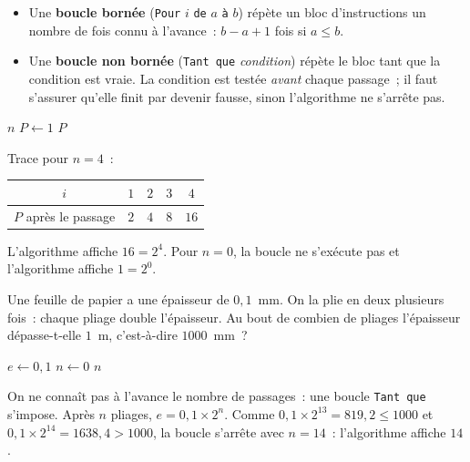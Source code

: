 \begin{defn}
\begin{itemize}
  \item Une \textbf{boucle bornée} (\texttt{Pour} $i$ \texttt{de} $a$ \texttt{à} $b$)
        répète un bloc d'instructions un nombre de fois connu à l'avance~:
        $b-a+1$ fois si $a\leq b$.
  \item Une \textbf{boucle non bornée} (\texttt{Tant que} \emph{condition})
        répète le bloc tant que la condition est vraie. La condition est testée
        \emph{avant} chaque passage~; il faut s'assurer qu'elle finit par devenir
        fausse, sinon l'algorithme ne s'arrête pas.
\end{itemize}
\end{defn}

\begin{ex}
\begin{algorithm}[H]
\caption{Puissance de $2$}
\Lire $n$\;
$P \leftarrow 1$\;
\Afficher $P$\;
\end{algorithm}
Trace pour $n=4$~:

\medskip\centering
\begin{tabular}{ccccc}
\toprule
$i$ & $1$ & $2$ & $3$ & $4$ \\
\midrule
$P$ après le passage & $2$ & $4$ & $8$ & $16$ \\
\bottomrule
\end{tabular}

\medskip\flushleft
L'algorithme affiche $16=2^4$. Pour $n=0$, la boucle ne s'exécute pas et
l'algorithme affiche $1=2^0$.
\end{ex}

\begin{ex}
Une feuille de papier a une épaisseur de $0{,}1$~mm. On la plie en deux
plusieurs fois~: chaque pliage double l'épaisseur. Au bout de combien de
pliages l'épaisseur dépasse-t-elle $1$~m, c'est-à-dire $1000$~mm~?

\begin{algorithm}[H]
\caption{Recherche d'un seuil}
$e \leftarrow 0{,}1$\;
$n \leftarrow 0$\;
\Afficher $n$\;
\end{algorithm}
On ne connaît pas à l'avance le nombre de passages~: une boucle \texttt{Tant que}
s'impose. Après $n$ pliages, $e=0{,}1\times2^n$. Comme
$0{,}1\times2^{13}=819{,}2\leq1000$ et $0{,}1\times2^{14}=1638{,}4>1000$,
la boucle s'arrête avec $n=14$~: l'algorithme affiche $14$.
\end{ex}

